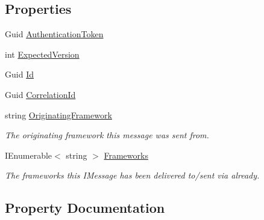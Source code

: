 \subsection*{Properties}
\begin{DoxyCompactItemize}
\item 
Guid \hyperlink{classCqrs_1_1Azure_1_1ServiceBus_1_1Tests_1_1Unit_1_1TestCommand_a98a038b33bcbfad2511543326906731c}{Authentication\+Token}
\item 
int \hyperlink{classCqrs_1_1Azure_1_1ServiceBus_1_1Tests_1_1Unit_1_1TestCommand_a58e0bae017d2975548504adfb927d00d}{Expected\+Version}
\item 
Guid \hyperlink{classCqrs_1_1Azure_1_1ServiceBus_1_1Tests_1_1Unit_1_1TestCommand_a77486cace45920a8478bc6e8c8fd50c2}{Id}
\item 
Guid \hyperlink{classCqrs_1_1Azure_1_1ServiceBus_1_1Tests_1_1Unit_1_1TestCommand_a1e92c111a69561faef294cd04839f236}{Correlation\+Id}
\item 
string \hyperlink{classCqrs_1_1Azure_1_1ServiceBus_1_1Tests_1_1Unit_1_1TestCommand_a8bea2fea080417034c031252641d88cd}{Originating\+Framework}
\begin{DoxyCompactList}\small\item\em The originating framework this message was sent from. \end{DoxyCompactList}\item 
I\+Enumerable$<$ string $>$ \hyperlink{classCqrs_1_1Azure_1_1ServiceBus_1_1Tests_1_1Unit_1_1TestCommand_acc509116aa049e8812c964233775d0c6}{Frameworks}
\begin{DoxyCompactList}\small\item\em The frameworks this I\+Message has been delivered to/sent via already. \end{DoxyCompactList}\end{DoxyCompactItemize}


\subsection{Property Documentation}
\mbox{\label{classCqrs_1_1Azure_1_1ServiceBus_1_1Tests_1_1Unit_1_1TestCommand_a98a038b33bcbfad2511543326906731c}} 
